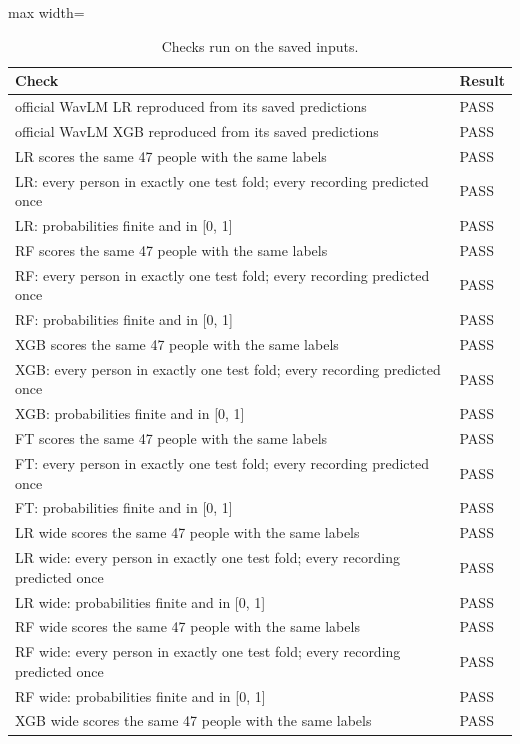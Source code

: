 \documentclass[11pt,a4paper]{article}
\begin{document}
\begin{table}[H]\centering\scriptsize\renewcommand{\arraystretch}{1.15}
\caption{Checks run on the saved inputs.}
\begin{adjustbox}{max width=\linewidth}\begin{tabular}{p{13.3cm}l}
\toprule
\textbf{Check} & \textbf{Result}\\
\midrule
official WavLM LR reproduced from its saved predictions & PASS\\
official WavLM XGB reproduced from its saved predictions & PASS\\
LR scores the same 47 people with the same labels & PASS\\
LR: every person in exactly one test fold; every recording predicted once & PASS\\
LR: probabilities finite and in [0, 1] & PASS\\
RF scores the same 47 people with the same labels & PASS\\
RF: every person in exactly one test fold; every recording predicted once & PASS\\
RF: probabilities finite and in [0, 1] & PASS\\
XGB scores the same 47 people with the same labels & PASS\\
XGB: every person in exactly one test fold; every recording predicted once & PASS\\
XGB: probabilities finite and in [0, 1] & PASS\\
FT scores the same 47 people with the same labels & PASS\\
FT: every person in exactly one test fold; every recording predicted once & PASS\\
FT: probabilities finite and in [0, 1] & PASS\\
LR wide scores the same 47 people with the same labels & PASS\\
LR wide: every person in exactly one test fold; every recording predicted once & PASS\\
LR wide: probabilities finite and in [0, 1] & PASS\\
RF wide scores the same 47 people with the same labels & PASS\\
RF wide: every person in exactly one test fold; every recording predicted once & PASS\\
RF wide: probabilities finite and in [0, 1] & PASS\\
XGB wide scores the same 47 people with the same labels & PASS\\

\end{tabular}
\end{adjustbox}
\end{table}
\end{document}
